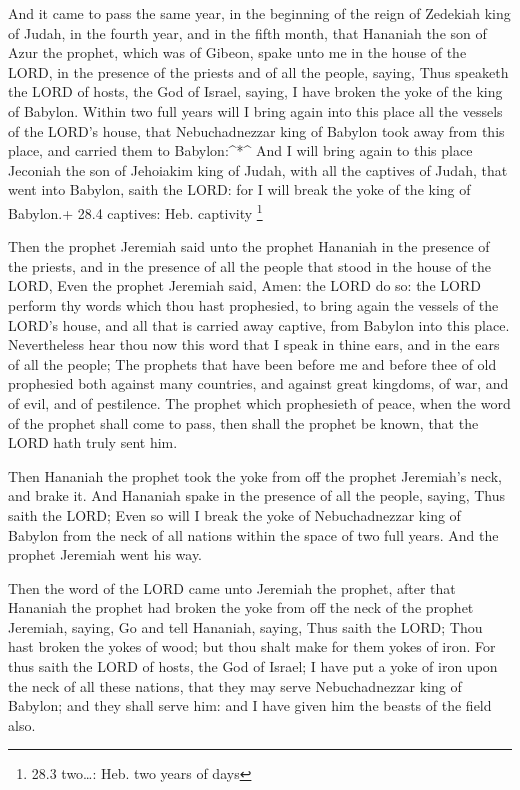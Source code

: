  And it came to pass the same year, in the beginning of the
reign of Zedekiah king of Judah, in the fourth year, and in the fifth
month, that Hananiah the son of Azur the prophet, which was of Gibeon,
spake unto me in the house of the LORD, in the presence of the priests
and of all the people, saying,  Thus speaketh the LORD of
hosts, the God of Israel, saying, I have broken the yoke of the king of
Babylon.  Within two full years will I bring again into this
place all the vessels of the LORD's house, that Nebuchadnezzar king of
Babylon took away from this place, and carried them to Babylon:\^{}*\^{}
 And I will bring again to this place Jeconiah the son of
Jehoiakim king of Judah, with all the captives of Judah, that went into
Babylon, saith the LORD: for I will break the yoke of the king of
Babylon.+ 28.4 captives: Heb. captivity \footnote{28.3 two\ldots: Heb.
  two years of days}

 Then the prophet Jeremiah said unto the prophet Hananiah in
the presence of the priests, and in the presence of all the people that
stood in the house of the LORD,  Even the prophet Jeremiah
said, Amen: the LORD do so: the LORD perform thy words which thou hast
prophesied, to bring again the vessels of the LORD's house, and all that
is carried away captive, from Babylon into this place. 
Nevertheless hear thou now this word that I speak in thine ears, and in
the ears of all the people;  The prophets that have been
before me and before thee of old prophesied both against many countries,
and against great kingdoms, of war, and of evil, and of pestilence.
 The prophet which prophesieth of peace, when the word of
the prophet shall come to pass, then shall the prophet be known, that
the LORD hath truly sent him.

 Then Hananiah the prophet took the yoke from off the
prophet Jeremiah's neck, and brake it.  And Hananiah spake
in the presence of all the people, saying, Thus saith the LORD; Even so
will I break the yoke of Nebuchadnezzar king of Babylon from the neck of
all nations within the space of two full years. And the prophet Jeremiah
went his way.

 Then the word of the LORD came unto Jeremiah the prophet,
after that Hananiah the prophet had broken the yoke from off the neck of
the prophet Jeremiah, saying,  Go and tell Hananiah,
saying, Thus saith the LORD; Thou hast broken the yokes of wood; but
thou shalt make for them yokes of iron.  For thus saith the
LORD of hosts, the God of Israel; I have put a yoke of iron upon the
neck of all these nations, that they may serve Nebuchadnezzar king of
Babylon; and they shall serve him: and I have given him the beasts of
the field also.

